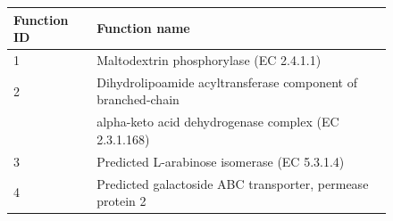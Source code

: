\begin{figure}[h]
\begin{center}
{\begin{tabular}{|l|l|}
\hline
\bf{Function ID} & \bf{Function name}\\ \hline
1 & Maltodextrin phosphorylase (EC 2.4.1.1) \\ \hline
2 & Dihydrolipoamide acyltransferase component of branched-chain \\ \hline
& alpha-keto acid dehydrogenase complex (EC 2.3.1.168) \\ \hline
3 & Predicted L-arabinose isomerase (EC 5.3.1.4) \\ \hline
4 & Predicted galactoside ABC transporter, permease protein 2 \\ \hline
\end{tabular}
}
\label{nafld_metagenomic_carb_pca}
\end{center}
\end{figure}

